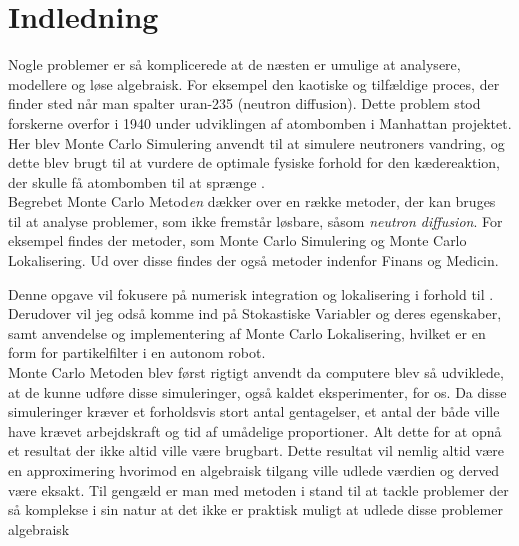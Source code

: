\documentclass[../../SRP.tex]{subfiles}
\begin{document}
\chapter{Indledning}

Nogle problemer er så komplicerede at de næsten er umulige at analysere, modellere og løse algebraisk. For eksempel den kaotiske og tilfældige proces, der finder sted når man spalter uran-235 (neutron diffusion). Dette problem stod forskerne overfor i 1940 under udviklingen af atombomben i Manhattan projektet. Her blev Monte Carlo Simulering anvendt til at simulere neutroners vandring, og dette blev brugt til at vurdere de optimale fysiske forhold for den kædereaktion, der skulle få atombomben til at sprænge \cite{AHF}. \\

Begrebet Monte Carlo Metod\textit{en} dækker over en række metoder, der kan bruges til at analyse problemer, som ikke fremstår løsbare, såsom \textit{neutron diffusion}. For eksempel findes der metoder, som Monte Carlo Simulering og Monte Carlo Lokalisering. Ud over disse findes der også metoder indenfor Finans og Medicin. 

Denne opgave vil fokusere på numerisk integration og lokalisering i forhold til . Derudover vil jeg odså komme ind på Stokastiske Variabler og deres egenskaber, samt anvendelse og implementering af Monte Carlo Lokalisering, hvilket er en form for partikelfilter i en autonom robot. \\

Monte Carlo Metoden blev først rigtigt anvendt da computere blev så udviklede, at de kunne udføre disse simuleringer, også kaldet eksperimenter, for os. Da disse simuleringer kræver et forholdsvis stort antal gentagelser, et antal der både ville have krævet arbejdskraft og tid af umådelige proportioner. Alt dette for at opnå et resultat der ikke altid ville være brugbart. Dette resultat vil nemlig altid være en approximering hvorimod en algebraisk tilgang ville udlede værdien og derved være eksakt. Til gengæld er man med metoden i stand til at tackle problemer der så komplekse i sin natur at det ikke er praktisk muligt at udlede disse problemer algebraisk \cite{SBM} \\
\end{document}
